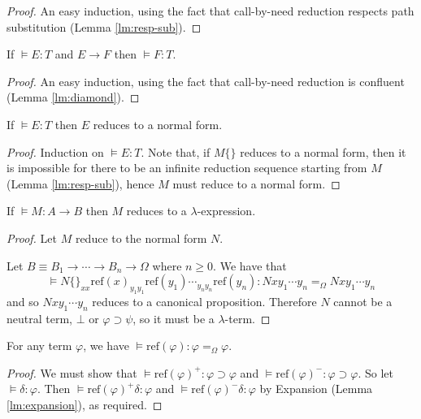 \documentclass[a4paper,UKenglish]{lipics-v2016}
\newcommand*{\reff}[1]{\ensuremath{\mathrm{ref} \left( {#1} \right)}}
\theoremstyle{plain}
\theoremstyle{definition}
\begin{document}
\begin{proof}
An easy induction, using the fact that call-by-need reduction respects path substitution (Lemma \ref{lm:resp-sub}).
\end{proof}

\begin{lemma}[Reduction]
\label{lm:reduction}
If $\models E : T$ and $E \rightarrow F$ then $\models F : T$.
\end{lemma}

\begin{proof}
An easy induction, using the fact that call-by-need reduction is confluent (Lemma \ref{lm:diamond}).
\end{proof}

\begin{lemma}
\label{lm:compute-SN}
If $\models E : T$ then $E$ reduces to a normal form.
\end{lemma}

\begin{proof}
Induction on $\models E : T$.  Note that, if $M \{\}$ reduces to a normal form, then
it is impossible for there to be an infinite reduction sequence starting from $M$ (Lemma \ref{lm:resp-sub}), hence $M$ must
reduce to a normal form.
\end{proof}

\begin{lemma}
\label{lm:pre-ref-compute}
If $\models M : A \rightarrow B$ then $M$ reduces to a $\lambda$-expression.
\end{lemma}

\begin{proof}
Let $M$ reduce to the normal form $N$.

Let $B \equiv B_1 \rightarrow \cdots \rightarrow B_n \rightarrow \Omega$ where $n \geq 0$.  We have that
\[ \models N \{\}_{xx} \reff{x}_{y_1 y_1} \reff{y_1} \cdots_{y_n y_n} \reff{y_n} : N x y_1 \cdots y_n =_\Omega N x y_1 \cdots y_n \]
and so $N x y_1 \cdots y_n$ reduces to a canonical proposition.  Therefore $N$ cannot be a neutral term, $\bot$ or $\varphi \supset \psi$,
so it must be a $\lambda$-term.
\end{proof}

\begin{lemma}
\label{lm:ref-compute-Omega}
For any term $\varphi$, we have $\models \reff{\varphi} : \varphi =_\Omega \varphi$.
\end{lemma}

\begin{proof}
We must show that $\models \reff{\varphi}^+ : \varphi \supset \varphi$ and $\models \reff{\varphi}^- : \varphi \supset \varphi$.  So let $\models \delta : \varphi$.
Then $\models \reff{\varphi}^+ \delta : \varphi$ and $\models \reff{\varphi}^- \delta : \varphi$ by Expansion (Lemma \ref{lm:expansion}), as required.
\end{proof}
\end{document}
